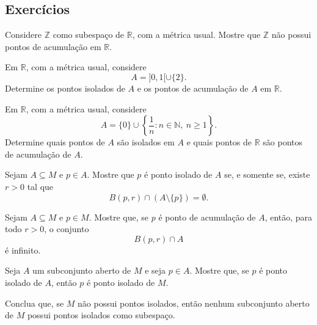 \subsection*{Exercícios}
\begin{exercise}
    Considere $\mathbb Z$ como subespaço de $\mathbb R$, com a métrica usual.
    Mostre que $\mathbb Z$ não possui pontos de acumulação em $\mathbb R$.
\end{exercise}

\begin{exercise}
    Em $\mathbb R$, com a métrica usual, considere
    \[
        A=]0,1[\cup\{2\}.
    \]
    Determine os pontos isolados de $A$ e os pontos de acumulação de $A$ em $\mathbb R$.
\end{exercise}

\begin{exercise}
    Em $\mathbb R$, com a métrica usual, considere
    \[
        A=\{0\}\cup\left\{\frac1n:n\in\mathbb N,\ n\geq 1\right\}.
    \]
    Determine quais pontos de $A$ são isolados em $A$ e quais pontos de $\mathbb R$ são pontos de acumulação de $A$.
\end{exercise}

\begin{exercise}
    Sejam $A\subseteq M$ e $p\in A$.
    Mostre que $p$ é ponto isolado de $A$ se, e somente se, existe $r>0$ tal que
    \[
        B(p,r)\cap (A\setminus\{p\})=\emptyset.
    \]
\end{exercise}

\begin{exercise}
    Sejam $A\subseteq M$ e $p\in M$.
    Mostre que, se $p$ é ponto de acumulação de $A$, então, para todo $r>0$, o conjunto
    \[
        B(p,r)\cap A
    \]
    é infinito.
\end{exercise}

\begin{exercise}
    Seja $A$ um subconjunto aberto de $M$ e seja $p\in A$.
    Mostre que, se $p$ é ponto isolado de $A$, então $p$ é ponto isolado de $M$.

    Conclua que, se $M$ não possui pontos isolados, então nenhum subconjunto aberto de $M$ possui pontos isolados como subespaço.
\end{exercise}
